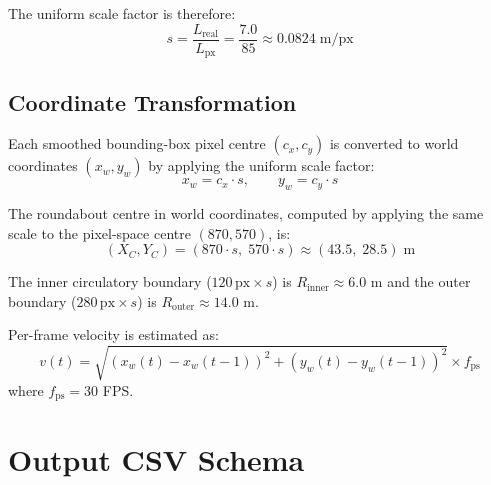\documentclass[12pt,a4paper]{report}
\begin{document}
The uniform scale factor is therefore:
\begin{equation}
    s = \frac{L_{\text{real}}}{L_{\text{px}}} = \frac{7.0}{85} \approx 0.0824\;\text{m/px}
    \label{eq:scale}
\end{equation}

\subsection{Coordinate Transformation}

Each smoothed bounding-box pixel centre $(c_x, c_y)$ is converted to world coordinates
$(x_w, y_w)$ by applying the uniform scale factor:
\begin{equation}
    x_w = c_x \cdot s, \qquad y_w = c_y \cdot s
    \label{eq:world}
\end{equation}

The roundabout centre in world coordinates, computed by applying the same scale to the
pixel-space centre $(870, 570)$, is:
\begin{equation}
    (X_C, Y_C) = (870 \cdot s,\; 570 \cdot s) \approx (43.5,\; 28.5)\;\text{m}
    \label{eq:centre}
\end{equation}

The inner circulatory boundary ($120\,\text{px} \times s$) is $R_{\text{inner}} \approx 6.0$ m
and the outer boundary ($280\,\text{px} \times s$) is $R_{\text{outer}} \approx 14.0$ m.

Per-frame velocity is estimated as:
\begin{equation}
    v(t) = \sqrt{(x_w(t) - x_w(t{-}1))^2 + (y_w(t) - y_w(t{-}1))^2} \times f_{\text{ps}}
    \label{eq:velocity}
\end{equation}
where $f_{\text{ps}} = 30$ FPS.

\section{Output CSV Schema}
\end{document}
